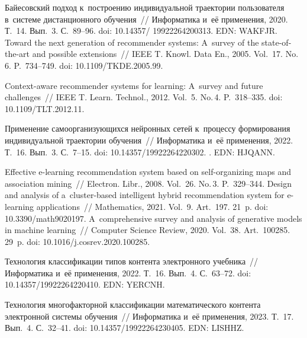 \begin{multicols}{2}
{{\begin{thebibliography}{99}
 Байесовский подход 
к~построению индивидуальной траектории пользователя в~сис\-те\-ме дистанционного 
обуче\-ния~// Информатика и~её применения, 2020. Т.~14. Вып.~3. С.~89--96. doi: 
10.14357/ 19922264200313. EDN: WAKFJR.
 Toward the next generation of recommender systems: 
A~survey of the state-of-the-art and possible extensions~// IEEE T. Knowl.  Data 
En., 2005. Vol.~17. No.\,6. P.~734--749. doi: 10.1109/TKDE.2005.99.

Context-aware recommender systems for learning: A~survey and future challenges~// IEEE 
T. Learn. Technol., 2012. Vol.~5. No.\,4. P.~318--335. doi: 10.1109/TLT.2012.11.

 Применение самоорганизующихся нейронных сетей к~процессу 
формирования индивидуальной траектории обучения~// Информатика и~её применения, 
2022. Т.~16. Вып.~3. С.~7--15. doi: 10.14357/19922264220302. . EDN: HJQANN.

 Effective e-learning recommendation system based on 
self-organizing maps and association mining~// Electron. Libr., 2008. Vol.~26. No.\,3. 
P.~329--344.
 Design and analysis of a~cluster-based intelligent 
hybrid recommendation system for e-learning applications~// Mathematics, 2021. Vol.~9. 
Art.~197. 21~p. doi: 10.3390/math9020197.
 A~comprehensive 
survey and analysis of generative models in machine learning~// Computer Science Review, 2020. 
Vol.~38. Art.~100285. 29~p. doi: 10.1016/j.cosrev.2020.100285.

 Технология классификации типов контента электронного 
учебника~// Информатика и~её применения, 2022. Т.~16. Вып.~4. С.~63--72. doi: 
10.14357/19922264220410. EDN: YERCNH.

 Технология многофакторной классификации 
математического контента электронной сис\-те\-мы обуче\-ния~// Информатика и~её 
применения, 2023. Т.~17. Вып.~4. С.~32--41. doi: 10.14357/19922264230405. EDN: LISHHZ.


\end{thebibliography}}}
\end{multicols}

